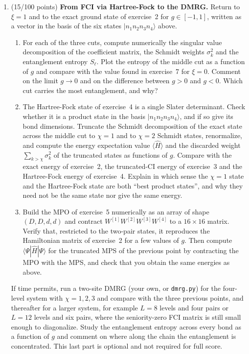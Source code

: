 \documentclass[prc]{revtex4} \usepackage[dvips]{graphicx}
\begin{document}
\begin{enumerate}
\item (15/100 points) \textbf{From FCI via Hartree-Fock to the DMRG.}
Return to $\xi=1$ and to the exact ground state of exercise~2 for
$g\in[-1,1]$, written as a vector in the basis of the six states
$|n_1n_2n_3n_4\rangle$ above.
\begin{enumerate}
\item For each of the three cuts, compute numerically the singular
  value decomposition of the coefficient matrix, the Schmidt weights
  $\sigma_k^2$ and the entanglement entropy $S_\ell$. Plot the entropy
  of the middle cut as a function of $g$ and compare with the value
  found in exercise~7 for $\xi=0$. Comment on the limit $g\to 0$ and on
  the difference between $g>0$ and $g<0$. Which cut carries the most
  entanglement, and why?
\item The Hartree-Fock state of exercise~4 is a single Slater
  determinant. Check whether it is a product state in the basis
  $|n_1n_2n_3n_4\rangle$, and if so give its bond dimensions. Truncate
  the Schmidt decomposition of the exact state across the middle cut
  to $\chi=1$ and to $\chi=2$ Schmidt states, renormalize, and compute
  the energy expectation value $\langle\hat{H}\rangle$ and the
  discarded weight $\sum_{k>\chi}\sigma_k^2$ of the truncated states as
  functions of $g$. Compare with the exact energy of exercise~2, the
  truncated-CI energy of exercise~3 and the Hartree-Fock energy of
  exercise~4. Explain in which sense the $\chi=1$ state and the
  Hartree-Fock state are both ``best product states'', and why they
  need not be the same state nor give the same energy.
\item Build the MPO of exercise~5 numerically as an array of shape
  $(D,D,d,d)$ and contract $W^{[1]}W^{[2]}W^{[3]}W^{[4]}$ to a
  $16\times 16$ matrix. Verify that, restricted to the two-pair
  states, it reproduces the Hamiltonian matrix of exercise~2 for a few
  values of $g$. Then compute $\langle\Psi|\hat{H}|\Psi\rangle$ for the
  truncated MPS of the previous point by contracting the MPO with the
  MPS, and check that you obtain the same energies as above.
\end{enumerate}
If time permits, run a two-site DMRG (your own, or
\texttt{dmrg.py}) for the four-level system with $\chi=1,2,3$ and
compare with the three previous points, and thereafter for a larger
system, for example $L=8$ levels and four pairs or $L=12$ levels and
six pairs, where the seniority-zero FCI matrix is still small enough
to diagonalize. Study the entanglement entropy across every bond as a
function of $g$ and comment on where along the chain the entanglement
is concentrated. This last part is optional and not required for full score.

\end{enumerate}



 
\end{document}
